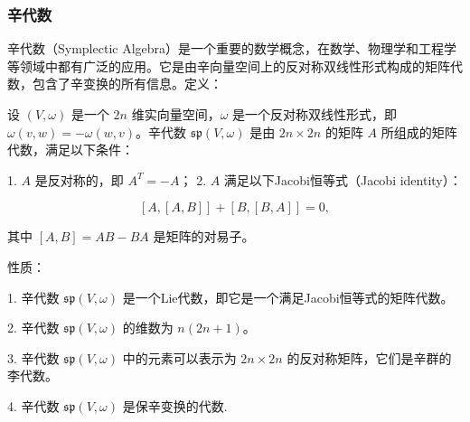 \documentclass[UTF8,a4paper,11pt]{article}
\begin{document}
\subsubsection{辛代数}
辛代数（Symplectic Algebra）是一个重要的数学概念，在数学、物理学和工程学等领域中都有广泛的应用。它是由辛向量空间上的反对称双线性形式构成的矩阵代数，包含了辛变换的所有信息。定义：

设 $(V,\omega)$ 是一个 $2n$ 维实向量空间，$\omega$ 是一个反对称双线性形式，即 $\omega(v,w) = -\omega(w,v)$。辛代数 $\mathfrak{sp}(V,\omega)$ 是由 $2n\times 2n$ 的矩阵 $A$ 所组成的矩阵代数，满足以下条件：

1. $A$ 是反对称的，即 $A^T = -A$；
2. $A$ 满足以下Jacobi恒等式（Jacobi identity）：

$$
[A,[A,B]] + [B,[B,A]] = 0,
$$

其中 $[A,B] = AB - BA$ 是矩阵的对易子。

性质：

1. 辛代数 $\mathfrak{sp}(V,\omega)$ 是一个Lie代数，即它是一个满足Jacobi恒等式的矩阵代数。

2. 辛代数 $\mathfrak{sp}(V,\omega)$ 的维数为 $n(2n+1)$。

3. 辛代数 $\mathfrak{sp}(V,\omega)$ 中的元素可以表示为 $2n\times 2n$ 的反对称矩阵，它们是辛群的李代数。

4. 辛代数 $\mathfrak{sp}(V,\omega)$ 是保辛变换的代数.
\end{document}
